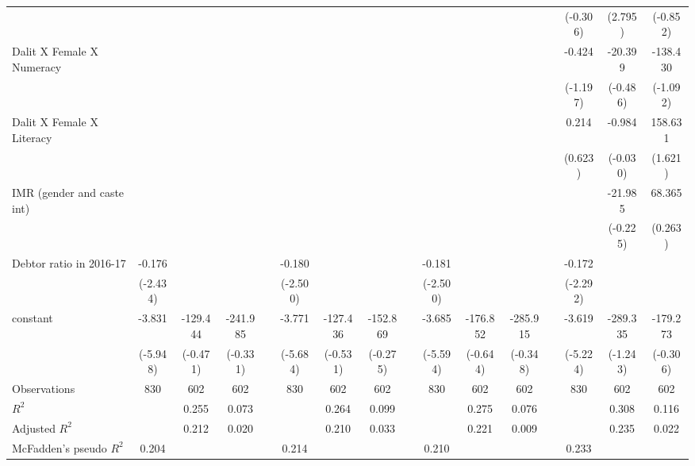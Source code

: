 {\begin{longtable}{@{\extracolsep{\fill}}lccccccccccccccc}
          &       &       &       &       &       &       &       &       &       &       &       &       & (-0.306) & (2.795) & (-0.852) \\
    Dalit X Female X Numeracy &       &       &       &       &       &       &       &       &       &       &       &       & -0.424 & -20.399 & -138.430 \\
          &       &       &       &       &       &       &       &       &       &       &       &       & (-1.197) & (-0.486) & (-1.092) \\
    Dalit X Female X Literacy &       &       &       &       &       &       &       &       &       &       &       &       & 0.214 & -0.984 & 158.631 \\
          &       &       &       &       &       &       &       &       &       &       &       &       & (0.623) & (-0.030) & (1.621) \\
    IMR (gender and caste int) &       &       &       &       &       &       &       &       &       &       &       &       &       & -21.985 & 68.365 \\
          &       &       &       &       &       &       &       &       &       &       &       &       &       & (-0.225) & (0.263) \\
    Debtor ratio in 2016-17 & -0.176 &       &       &       & -0.180 &       &       &       & -0.181 &       &       &       & -0.172 &       &  \\
          & (-2.434) &       &       &       & (-2.500) &       &       &       & (-2.500) &       &       &       & (-2.292) &       &  \\
    constant & -3.831 & -129.444 & -241.985 &       & -3.771 & -127.436 & -152.869 &       & -3.685 & -176.852 & -285.915 &       & -3.619 & -289.335 & -179.273 \\
          & (-5.948) & (-0.471) & (-0.331) &       & (-5.684) & (-0.531) & (-0.275) &       & (-5.594) & (-0.644) & (-0.348) &       & (-5.224) & (-1.243) & (-0.306) \\
    \midrule
    Observations & 830 & 602 & 602 &   & 830 & 602 & 602 &   & 830 & 602 & 602 &   & 830 & 602 & 602 \\
    $R^2$ &   & 0.255 & 0.073 &   &   & 0.264 & 0.099 &   &   & 0.275 & 0.076 &   &   & 0.308 & 0.116 \\
    Adjusted $R^2$ &   & 0.212 & 0.020 &   &   & 0.210 & 0.033 &   &   & 0.221 & 0.009 &   &   & 0.235 & 0.022 \\
    McFadden's pseudo $R^2$ & 0.204 &   &   &   & 0.214 &   &   &   & 0.210 &   &   &   & 0.233 &   &  \\

\end{longtable}}
